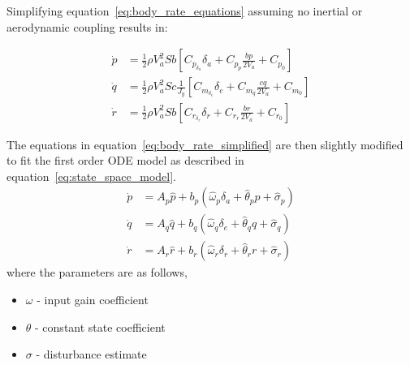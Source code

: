 Simplifying equation~\ref{eq:body_rate_equations} assuming no inertial or aerodynamic coupling results in:

\begin{equation}\label{eq:body_rate_simplified}
\begin{split}
 \dot{p}&=\frac{1}{2}\rho V_a^2Sb\left[C_{p_{\delta_a}}\delta_a+C_{p_p}\frac{bp}{2V_a}+C_{p_0}\right]\\
 \dot{q}&=\frac{1}{2}\rho V_a^2Sc\frac{1}{J_y}\left[C_{m_{\delta_e}}\delta_e+C_{m_q}\frac{cq}{2V_a}+C_{m_0}\right]\\
 \dot{r}&=\frac{1}{2}\rho V_a^2Sb\left[C_{r_{\delta_r}}\delta_r+C_{r_r}\frac{br}{2V_a}+C_{r_0}\right]
\end{split} 
\end{equation}

The equations in equation~\ref{eq:body_rate_simplified} are then slightly modified to fit the first order \ac{ODE} model as described in equation~\ref{eq:state_space_model}.
\begin{equation}\label{eq:simplified_ac_model}
\begin{split}
\dot{p}&=A_p\hat{p}+b_p\left(\hat{\omega}_p\delta_a+\hat{\theta}_pp+\hat{\sigma}_p\right)\\
\dot{q}&=A_q\hat{q}+b_q\left(\hat{\omega}_q\delta_e+\hat{\theta}_qq+\hat{\sigma}_q\right)\\
\dot{r}&=A_r\hat{r}+b_r\left(\hat{\omega}_r\delta_r+\hat{\theta}_rr+\hat{\sigma}_r\right)
\end{split}
\end{equation}
where the parameters are as follows,
\begin{itemize}
 \item[] $\omega$ - input gain coefficient
 \item[] $\theta$ - constant state coefficient
 \item[] $\sigma$ - disturbance estimate
\end{itemize}

